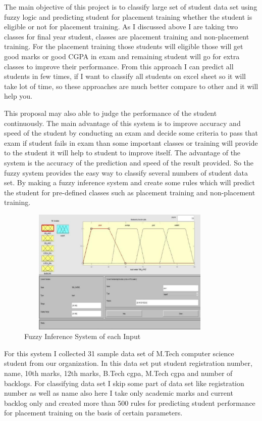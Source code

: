 \documentclass[12pt]{article}
\begin{document}
The main objective of this project is to classify large set of 
student data set using fuzzy logic and predicting student for 
placement training whether the student is eligible or not for 
placement training. As I discussed above I are taking two 
classes for final year student, classes are placement training and 
non-placement training. For the placement training those students 
will eligible those will get good marks or good CGPA in exam 
and remaining student will go for extra classes to improve their 
performance. From this approach I can predict all students in 
few times, if I want to classify all students on excel sheet so it 
will take lot of time, so these approaches are much better compare 
to other and it will help you. 

This proposal may also able to judge the performance of the 
student continuously. The main advantage of this system is to 
improve accuracy and speed of the student by conducting an exam 
and decide some criteria to pass that exam if student fails in exam 
than some important classes or training will provide to the student 
it will help to student to improve itself. The advantage of the 
system is the accuracy of the prediction and speed of the result 
provided. So the fuzzy system provides the easy way to classify 
several numbers of student data set. By making a fuzzy inference 
system and create some rules which will predict the student for 
pre-defined classes such as placement training and non-placement 
training.

\begin{figure}[H]
\begin{center}
 \includegraphics[width=10cm, height=6cm]{L3P1}
\caption{Fuzzy Inference System of each Input}
\end{center}
\end{figure}

For this system I collected 31 sample data set of M.Tech 
computer science student from our organization. In this data set 
put student registration number, name, 10th marks, 12th marks, 
B.Tech cgpa, M.Tech cgpa and number of backlogs. For 
classifying data set I skip some part of data set like registration 
number as well as name also here I take only academic marks 
and current backlog only and created more than 500 rules for 
predicting student performance for placement training on the 
basis of certain parameters. 
\end{document}
